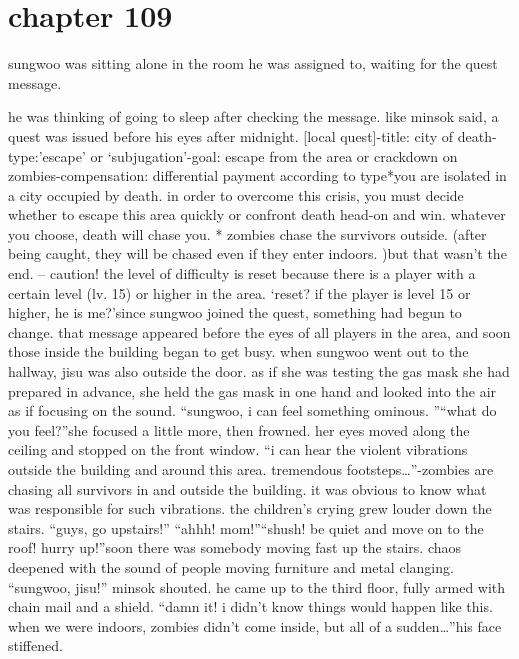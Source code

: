 \section{chapter 109}

                            sungwoo was sitting alone in the room he was assigned to, waiting for the quest message.





he was thinking of going to sleep after checking the message.
like minsok said, a quest was issued before his eyes after midnight.
[local quest]-title: city of death-type:’escape’ or ‘subjugation’-goal: escape from the area or crackdown on zombies-compensation: differential payment according to type*you are isolated in a city occupied by death.
 in order to overcome this crisis, you must decide whether to escape this area quickly or confront death head-on and win.
 whatever you choose, death will chase you.
* zombies chase the survivors outside.
 (after being caught, they will be chased even if they enter indoors.
)but that wasn’t the end.
– caution! the level of difficulty is reset because there is a player with a certain level (lv.
 15) or higher in the area.
‘reset? if the player is level 15 or higher, he is me?’since sungwoo joined the quest, something had begun to change.
 that message appeared before the eyes of all players in the area, and soon those inside the building began to get busy.
when sungwoo went out to the hallway, jisu was also outside the door.
 as if she was testing the gas mask she had prepared in advance, she held the gas mask in one hand and looked into the air as if focusing on the sound.
“sungwoo, i can feel something ominous.
”“what do you feel?”she focused a little more, then frowned.
 her eyes moved along the ceiling and stopped on the front window.
“i can hear the violent vibrations outside the building and around this area.
 tremendous footsteps…”-zombies are chasing all survivors in and outside the building.
it was obvious to know what was responsible for such vibrations.
 the children’s crying grew louder down the stairs.
“guys, go upstairs!”
“ahhh! mom!”“shush! be quiet and move on to the roof! hurry up!”soon there was somebody moving fast up the stairs.
 chaos deepened with the sound of people moving furniture and metal clanging.
“sungwoo, jisu!” minsok shouted.
he came up to the third floor, fully armed with chain mail and a shield.
“damn it! i didn’t know things would happen like this.
 when we were indoors, zombies didn’t come inside, but all of a sudden…”his face stiffened.
